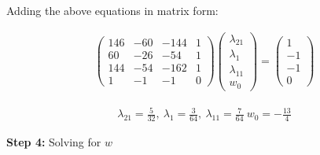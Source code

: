 \documentclass[12pt]{report}
\begin{document}
Adding the above equations in matrix form:

\begin{equation*}
	\begin{aligned}
		\begin{pmatrix}146 & -60 & -144 & 1 \\ 60&-26&-54&1\\ 144&-54&-162&1\\ 1&-1&-1&0\end{pmatrix}\begin{pmatrix}\lambda_{21}\\ \lambda_{1}\\ \lambda_{11}\\ w_{0}\end{pmatrix}=\begin{pmatrix}1\\ -1\\ -1\\ 0\end{pmatrix}
	\end{aligned}
\end{equation*}

\begin{equation*}
	\begin{aligned}
		\lambda_{21}=\frac{5}{32},\:\lambda_{1}=\frac{3}{64},\:\lambda_{11}=\frac{7}{64}\:w_{0}=-\frac{13}{4}
	\end{aligned}
\end{equation*}

\vspace{20pt}

\textbf{Step 4:} Solving for $w$
\end{document}
